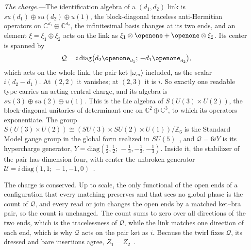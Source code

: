 \documentclass[aps,prl,reprint,superscriptaddress,longbibliography,nofootinbib,floatfix]{revtex4-2}
\theoremstyle{definition}
\newcommand{\ket}[1]{|#1\rangle}
\begin{document}
\emph{The charge.}---The identification algebra of a $(d_{1},d_{2})$ link is $su(d_{1})\oplus su(d_{2})\oplus u(1)$, the block-diagonal traceless anti-Hermitian operators on $\mathbb{C}^{d_{1}}\oplus\mathbb{C}^{d_{2}}$, the infinitesimal basis changes at its two ends, and an element $\xi=\xi_{1}\oplus\xi_{2}$ acts on the link as $\xi_{1}\otimes\openone+\openone\otimes\xi_{2}$. Its center is spanned by
\begin{equation}
\mathcal{Q} = i\,\mathrm{diag}\big(d_{2}\openone_{d_{1}};\,-d_{1}\openone_{d_{2}}\big),
\label{eq:Q}
\end{equation}
which acts on the whole link, the pair ket $\ket{\omega_{m}}$ included, as the scalar $i(d_{2}-d_{1})$. At $(2,2)$ it vanishes; at $(2,3)$ it is $i$. So exactly one readable type carries an acting central charge, and its algebra is $su(3)\oplus su(2)\oplus u(1)$. This is the Lie algebra of $S(U(3)\times U(2))$, the block-diagonal unitaries of determinant one on $\mathbb{C}^{2}\oplus\mathbb{C}^{3}$, to which its operators exponentiate. The group $S(U(3)\times U(2))\cong(SU(3)\times SU(2)\times U(1))/\mathbb{Z}_{6}$ is the Standard Model gauge group in the global form realized in $SU(5)$~\cite{baez2010}, and $\mathcal{Q}=6iY$ is its hypercharge generator, $Y=\mathrm{diag}(\tfrac{1}{2},\tfrac{1}{2};\,-\tfrac{1}{3},-\tfrac{1}{3},-\tfrac{1}{3})$. Inside it, the stabilizer of the pair has dimension four, with center the unbroken generator $\mathcal{U}=i\,\mathrm{diag}(1,1;\,-1,-1,0)$~\cite{SM}.

The charge is conserved. Up to scale, the only functional of the open ends of a configuration that every matching preserves and that sees no global phase is the count of $\mathcal{Q}$, and every read or join changes the open ends by a matched ket--bra pair, so the count is unchanged. The count sums to zero over all directions of the two ends, which is the tracelessness of $\mathcal{Q}$, while the link matches one direction of each end, which is why $\mathcal{Q}$ acts on the pair ket as $i$. Because the twirl fixes $\mathcal{Q}$, its dressed and bare insertions agree, $Z_{1}=Z_{2}$~\cite{SM}.
\end{document}
